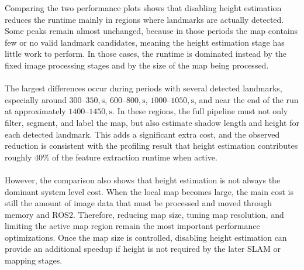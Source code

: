 \noindent
Comparing the two performance plots shows that disabling height estimation reduces the runtime mainly in regions where landmarks are actually detected. Some peaks remain almost unchanged, because in those periods the map contains few or no valid landmark candidates, meaning the height estimation stage has little work to perform. In those cases, the runtime is dominated instead by the fixed image processing stages and by the size of the map being processed.
\\ \\
The largest differences occur during periods with several detected landmarks, especially around $300$--$350,\mathrm{s}$, $600$--$800,\mathrm{s}$, $1000$--$1050,\mathrm{s}$, and near the end of the run at approximately $1400$--$1450,\mathrm{s}$. In these regions, the full pipeline must not only filter, segment, and label the map, but also estimate shadow length and height for each detected landmark. This adds a significant extra cost, and the observed reduction is consistent with the profiling result that height estimation contributes roughly $40\%$ of the feature extraction runtime when active.
\\ \\
However, the comparison also shows that height estimation is not always the dominant system level cost. When the local map becomes large, the main cost is still the amount of image data that must be processed and moved through memory and ROS2. Therefore, reducing map size, tuning map resolution, and limiting the active map region remain the most important performance optimizations. Once the map size is controlled, disabling height estimation can provide an additional speedup if height is not required by the later SLAM or mapping stages.
